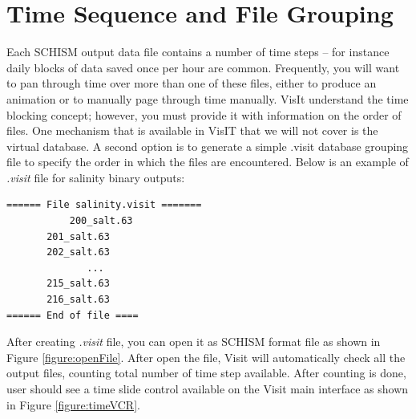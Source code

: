 \documentclass[12pt]{report}
\begin{document}
\section{Time Sequence and File Grouping}
\label{sec:time}
Each SCHISM output data file contains a number of time steps -- for instance daily blocks of data saved once per hour are common.
Frequently, you will want to pan through time over more than one of these files, either to produce an animation
or to manually page through time manually. VisIt understand the time blocking concept; however, you must provide it
with information on the order of files. One mechanism that is available in VisIT that we will not cover is the virtual database.
A second option is to generate a simple .visit database grouping file to specify the order in which the files are encountered. Below is an example of \emph{.visit} file for salinity binary outputs:

\begin{verbatim}
====== File salinity.visit =======
		   200_salt.63
       201_salt.63
       202_salt.63
			  ... 
       215_salt.63
       216_salt.63
====== End of file ====
\end{verbatim}
				
After creating \emph{.visit} file, you can open it as SCHISM format file as shown in Figure \ref{figure:openFile}. After open the file, Visit will automatically check all the output files, counting total number of time step available. After counting is done, user should see a time slide control available on the Visit main interface as shown in Figure \ref{figure:timeVCR}.
\end{document}

